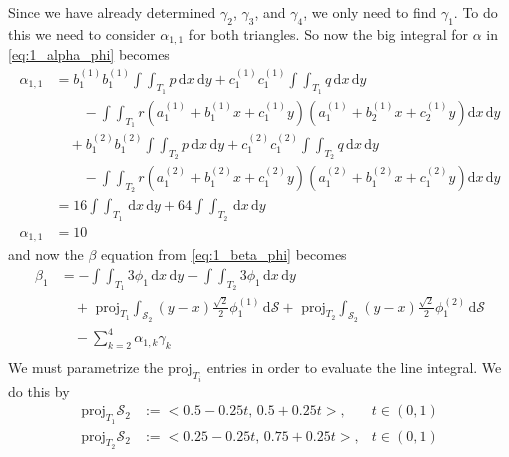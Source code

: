 \documentclass[12pt]{article}
\newcommand{\dd}[1]{\mathrm{d}{#1}}
\begin{document}
Since we have already determined $\gamma_2$, $\gamma_3$, and $\gamma_4$,
we only need to find $\gamma_1$. To do this we need to consider
$\alpha_{1,1}$ for both triangles. So now the big integral for $\alpha$
in \cref{eq:1_alpha_phi} becomes
\begin{equation}
  \label{eq:1_alpha_1_1_nophi}
  \begin{aligned}
    \alpha_{1,1}&=
    b_1^{(1)}b_1^{(1)}\int\int_{T_1} p\, \dd{x}\,\dd{y} +
    c_1^{(1)}c_1^{(1)}\int\int_{T_1} q\, \dd{x}\,\dd{y} \\ &\qquad-
    \int\int_{T_1} r (a_1^{(1)} + b_1^{(1)}x + c_1^{(1)}y)(a_1^{(1)} +
    b_2^{(1)}x + c_2^{(1)}y) \dd{x}\,\dd{y} \\ &\quad+ 
    b_1^{(2)}b_1^{(2)}\int\int_{T_2} p\, \dd{x}\,\dd{y} +
    c_1^{(2)}c_1^{(2)}\int\int_{T_2} q\, \dd{x}\,\dd{y} \\ &\qquad-
    \int\int_{T_2} r(a_1^{(2)} + b_1^{(2)}x + c_1^{(2)}y)(a_1^{(2)} +
    b_1^{(2)}x + c_1^{(2)}y)\dd{x}\,\dd{y} \\
    &=16\int\int_{T_1} \, \dd{x}\,\dd{y} +
    64\int\int_{T_2} \, \dd{x}\,\dd{y} \\
    \alpha_{1,1}&=10
  \end{aligned}
\end{equation}
and now the $\beta$ equation from \cref{eq:1_beta_phi} becomes
\begin{equation}
  \label{eq:1_beta_prepara}
  \begin{aligned}
    \beta_1 &= -\int\int_{T_1}3\phi_1 \,\dd{x}\,\dd{y} -
    \int\int_{T_2}3\phi_1 \,\dd{x}\,\dd{y} \\ &\quad+
    \text{ proj}_{T_1}\int_{\mathcal{S}_2} 
    (y-x)\frac{\sqrt{2}}{2}\phi_1^{(1)}\,\dd{\mathcal{S}} +
    \text{ proj}_{T_2}\int_{\mathcal{S}_2}
    (y-x)\frac{\sqrt{2}}{2}\phi_1^{(2)}\,\dd{\mathcal{S}} \\ &\quad-
    \sum_{k=2}^{4}\alpha_{1,k}\gamma_{k}\\
  \end{aligned}
\end{equation}
We must parametrize the $\text{proj}_{T_i}$ entries in order to evaluate
the line integral. We do this by
\begin{equation}
  \label{eq:1_t1_para}
  \begin{aligned}
    \text{proj}_{T_1}\mathcal{S}_2 
    &:= <0.5-0.25t,\,0.5+0.25t>,&t\in(0,1) \\
    \text{proj}_{T_2}\mathcal{S}_2 
    &:= <0.25-0.25t,\,0.75+0.25t>,&t\in(0,1) \\
  \end{aligned}
\end{equation}
\end{document}
